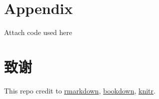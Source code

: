\documentclass[AutoFakeBold,AutoFakeSlant,scheme=plain,degree=bachelor,zihao=-4]{sustechthesis}
\theoremstyle{definition}
\theoremstyle{definition}
\theoremstyle{definition}
\theoremstyle{definition}
\theoremstyle{remark}
\begin{document}
\clearpage

\hypertarget{appendix}{%
\section*{Appendix}\label{appendix}}

Attach code used here

\clearpage

\hypertarget{ux81f4ux8c22}{%
\section*{致谢}\label{ux81f4ux8c22}}

This repo credit to \href{}{rmarkdown}, \href{}{bookdown}, \href{}{knitr}.

% 
% 

\end{document}
